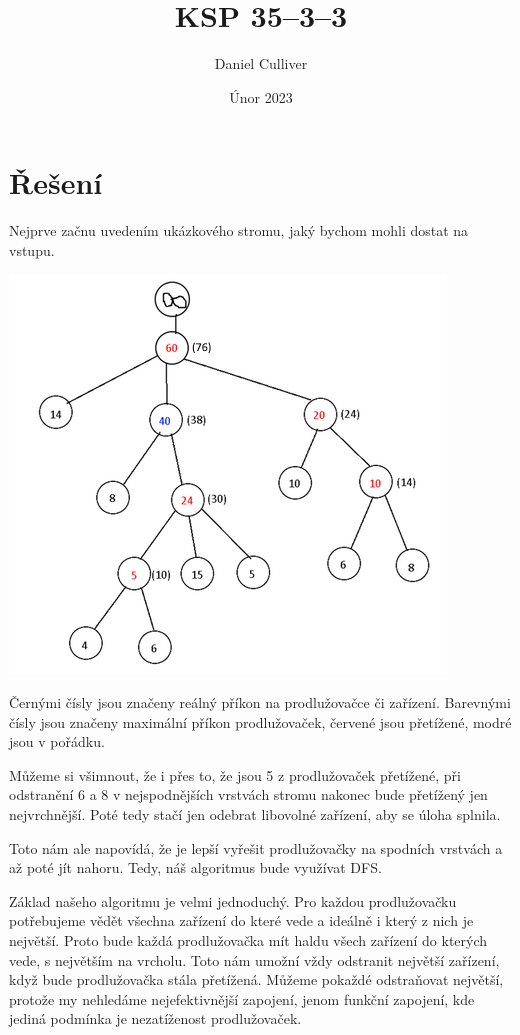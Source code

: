 \documentclass{../../../ksp}
\title{KSP 35--3--3}
\author{Daniel Culliver}
\date{Únor 2023}
\begin{document}
\maketitle

\section*{Řešení}

Nejprve začnu uvedením ukázkového stromu, jaký bychom mohli dostat na vstupu.

\includegraphics{strom2}

Černými čísly jsou značeny reálný příkon na prodlužovačce či zařízení.
Barevnými čísly jsou značeny maximální příkon prodlužovaček, červené jsou přetížené, modré jsou v pořádku.

Můžeme si všimnout, že i přes to, že jsou 5 z prodlužovaček přetížené, při odstranění 6 a 8 v nejspodnějších vrstvách stromu
nakonec bude přetížený jen nejvrchnější. Poté tedy stačí jen odebrat libovolné zařízení, aby se úloha splnila.

Toto nám ale napovídá, že je lepší vyřešit prodlužovačky na spodních vrstvách a až poté jít nahoru.
Tedy, náš algoritmus bude využívat DFS.\@

Základ našeho algoritmu je velmi jednoduchý. Pro každou prodlužovačku potřebujeme vědět všechna zařízení do které vede
a ideálně i který z nich je největší. Proto bude každá prodlužovačka mít haldu všech zařízení do kterých vede, s největším na vrcholu.
Toto nám umožní vždy odstranit největší zařízení, když bude prodlužovačka stála přetížená. Můžeme pokaždé odstraňovat největší, protože
my nehledáme nejefektivnější zapojení, jenom funkční zapojení, kde jediná podmínka je nezatíženost prodlužovaček.
\end{document}
